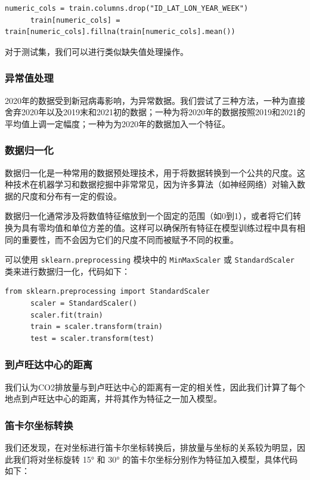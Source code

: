 \documentclass{ctexart}
\begin{document}
\begin{lstlisting}[style=Python]
      numeric_cols = train.columns.drop("ID_LAT_LON_YEAR_WEEK")
      train[numeric_cols] = train[numeric_cols].fillna(train[numeric_cols].mean())
\end{lstlisting}

对于测试集，我们可以进行类似缺失值处理操作。

\subsubsection{异常值处理}
2020年的数据受到新冠病毒影响，为异常数据。我们尝试了三种方法，一种为直接舍弃2020年以及2019末和2021初的数据；一种为将2020年的数据按照2019和2021的平均值上调一定幅度；一种为为2020年的数据加入一个特征。

\subsubsection{数据归一化}

数据归一化是一种常用的数据预处理技术，用于将数据转换到一个公共的尺度。这种技术在机器学习和数据挖掘中非常常见，因为许多算法（如神经网络）对输入数据的尺度和分布有一定的假设。

数据归一化通常涉及将数值特征缩放到一个固定的范围（如0到1），或者将它们转换为具有零均值和单位方差的值。这样可以确保所有特征在模型训练过程中具有相同的重要性，而不会因为它们的尺度不同而被赋予不同的权重。

可以使用 \texttt{sklearn.preprocessing} 模块中的 \texttt{MinMaxScaler} 或 \texttt{StandardScaler} 类来进行数据归一化，代码如下：

\begin{lstlisting}[style=Python]
      from sklearn.preprocessing import StandardScaler
      scaler = StandardScaler()
      scaler.fit(train)
      train = scaler.transform(train)
      test = scaler.transform(test)
\end{lstlisting}

\subsubsection{到卢旺达中心的距离}
我们认为CO2排放量与到卢旺达中心的距离有一定的相关性，因此我们计算了每个地点到卢旺达中心的距离，并将其作为特征之一加入模型。

\subsubsection{笛卡尔坐标转换}
我们还发现，在对坐标进行笛卡尔坐标转换后，排放量与坐标的关系较为明显，因此我们将对坐标旋转 15° 和 30° 的笛卡尔坐标分别作为特征加入模型，具体代码如下：
\end{document}
